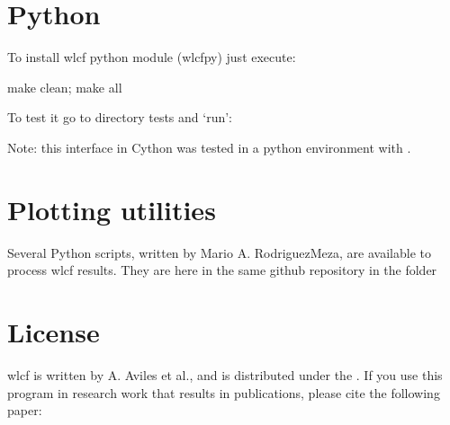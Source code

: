 \documentclass[letterpaper,10pt,english]{sphinxmanual}
\begin{document}
\section{Python}
\label{\detokenize{overview:python}}
\sphinxAtStartPar
To install wlcf python module (wlcfpy) just execute:

\begin{sphinxVerbatim}[commandchars=\\\{\}]
\PYGZdl{} make clean; make all
\end{sphinxVerbatim}

\sphinxAtStartPar
To test it go to directory tests and ‘run’:

\begin{sphinxVerbatim}[commandchars=\\\{\}]
 
\end{sphinxVerbatim}

\sphinxAtStartPar
Note: this interface in Cython was tested in a python environment with .


\section{Plotting utilities}
\label{\detokenize{overview:plotting-utilities}}
\sphinxAtStartPar
Several Python scripts, written by Mario A. Rodriguez\sphinxhyphen{}Meza, are available to process wlcf results. They are here in the same github repository in the  folder


\section{License}
\label{\detokenize{overview:license}}
\sphinxAtStartPar
wlcf is written by A. Aviles et al., and is distributed under the . If you use this program in research work that results in publications, please cite the following paper:

\sphinxAtStartPar
{}
\end{document}
